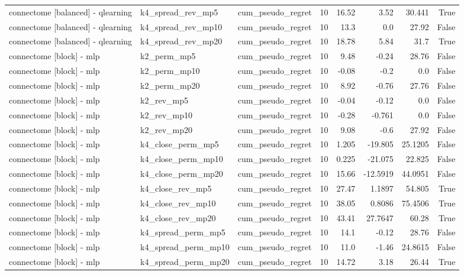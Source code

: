 \begin{table}[t]
\begin{tabular}{lllrrrrr}
connectome [balanced] - qlearning & k4\_spread\_rev\_mp5 & cum\_pseudo\_regret & 10 & 16.52 & 3.52 & 30.441 & True \\
connectome [balanced] - qlearning & k4\_spread\_rev\_mp10 & cum\_pseudo\_regret & 10 & 13.3 & 0.0 & 27.92 & False \\
connectome [balanced] - qlearning & k4\_spread\_rev\_mp20 & cum\_pseudo\_regret & 10 & 18.78 & 5.84 & 31.7 & True \\
connectome [block] - mlp & k2\_perm\_mp5 & cum\_pseudo\_regret & 10 & 9.48 & -0.24 & 28.76 & False \\
connectome [block] - mlp & k2\_perm\_mp10 & cum\_pseudo\_regret & 10 & -0.08 & -0.2 & 0.0 & False \\
connectome [block] - mlp & k2\_perm\_mp20 & cum\_pseudo\_regret & 10 & 8.92 & -0.76 & 27.76 & False \\
connectome [block] - mlp & k2\_rev\_mp5 & cum\_pseudo\_regret & 10 & -0.04 & -0.12 & 0.0 & False \\
connectome [block] - mlp & k2\_rev\_mp10 & cum\_pseudo\_regret & 10 & -0.28 & -0.761 & 0.0 & False \\
connectome [block] - mlp & k2\_rev\_mp20 & cum\_pseudo\_regret & 10 & 9.08 & -0.6 & 27.92 & False \\
connectome [block] - mlp & k4\_close\_perm\_mp5 & cum\_pseudo\_regret & 10 & 1.205 & -19.805 & 25.1205 & False \\
connectome [block] - mlp & k4\_close\_perm\_mp10 & cum\_pseudo\_regret & 10 & 0.225 & -21.075 & 22.825 & False \\
connectome [block] - mlp & k4\_close\_perm\_mp20 & cum\_pseudo\_regret & 10 & 15.66 & -12.5919 & 44.0951 & False \\
connectome [block] - mlp & k4\_close\_rev\_mp5 & cum\_pseudo\_regret & 10 & 27.47 & 1.1897 & 54.805 & True \\
connectome [block] - mlp & k4\_close\_rev\_mp10 & cum\_pseudo\_regret & 10 & 38.05 & 0.8086 & 75.4506 & True \\
connectome [block] - mlp & k4\_close\_rev\_mp20 & cum\_pseudo\_regret & 10 & 43.41 & 27.7647 & 60.28 & True \\
connectome [block] - mlp & k4\_spread\_perm\_mp5 & cum\_pseudo\_regret & 10 & 14.1 & -0.12 & 28.76 & False \\
connectome [block] - mlp & k4\_spread\_perm\_mp10 & cum\_pseudo\_regret & 10 & 11.0 & -1.46 & 24.8615 & False \\
connectome [block] - mlp & k4\_spread\_perm\_mp20 & cum\_pseudo\_regret & 10 & 14.72 & 3.18 & 26.44 & True \\

\end{tabular}
\end{table}
